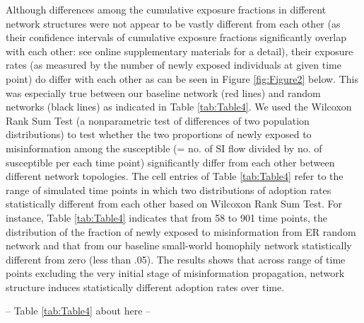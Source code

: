\documentclass[man, 12pt, a4paper, nolmodern, noextraspace]{apa6}
\begin{document}
    Although differences among the cumulative exposure fractions in different network structures were not appear to be vastly different from each other (as their confidence intervals of cumulative exposure fractions significantly overlap with each other: see online supplementary materials for a detail), their exposure rates (as measured by the number of newly exposed individuals at given time point) do differ with each other as can be seen in Figure \ref{fig:Figure2} below. This was especially true between our baseline network (red lines) and random networks (black lines) as indicated in Table \ref{tab:Table4}. We used the Wilcoxon Rank Sum Test (a nonparametric test of differences of two population distributions) to test whether the two proportions of newly exposed to misinformation among the susceptible (= no. of SI flow divided by no. of susceptible per each time point) significantly differ from each other between different network topologies. The cell entries of Table \ref{tab:Table4} refer to the range of simulated time points in which two distributions of adoption rates statistically different from each other based on Wilcoxon Rank Sum Test. For instance, Table \ref{tab:Table4} indicates that from 58 to 901 time points, the distribution of the fraction of newly exposed to misinformation from ER random network and that from our baseline small-world homophily network statistically different from zero (less than .05). The results shows that across range of time points excluding the very initial stage of misinformation propagation, network structure induces statistically different adoption rates over time.    
\centerline{ -- Table \ref{tab:Table4} about here -- }  
\end{document}
